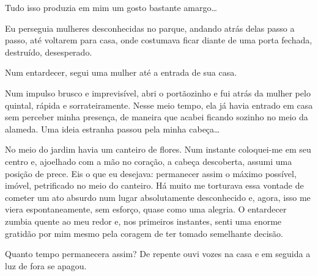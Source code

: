 
Tudo isso produzia em mim um gosto bastante amargo\ldots{}

Eu perseguia mulheres desconhecidas no parque, andando atrás delas passo a
passo, até voltarem para casa, onde costumava ficar diante de uma porta
fechada, destruído, desesperado.

Num entardecer, segui uma mulher até a entrada de sua casa.


Num impulso brusco e imprevisível, abri o portãozinho e fui atrás da mulher
pelo quintal, rápida e sorrateiramente. Nesse meio tempo, ela já havia
entrado em casa sem perceber minha presença, de maneira que acabei ficando
sozinho no meio da alameda. Uma ideia estranha passou pela minha cabeça\ldots
{}

No meio do jardim havia um canteiro de flores. Num instante coloquei-me em seu
centro e, ajoelhado com a mão no coração, a cabeça descoberta, assumi uma
posição de prece. Eis o que eu desejava: permanecer assim o máximo possível,
imóvel, petrificado no meio do canteiro. Há muito me torturava essa vontade
de cometer um ato absurdo num lugar absolutamente desconhecido e, agora, isso
me viera espontaneamente, sem esforço, quase como uma alegria. O entardecer
zumbia quente ao meu redor e, nos primeiros instantes, senti uma enorme
gratidão por mim mesmo pela coragem de ter tomado semelhante decisão.


Quanto tempo permanecera assim? De repente ouvi vozes na casa e em seguida a
luz de fora se apagou.

